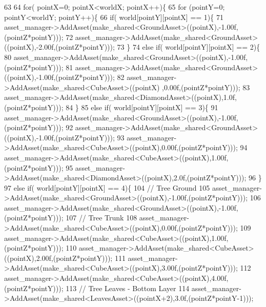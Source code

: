 \begin{DoxyCode}
63 
64   \textcolor{keywordflow}{for}( pointX=0; pointX<worldX; pointX++)\{
65    \textcolor{keywordflow}{for} (pointY=0; pointY<worldY; pointY++)\{
66     \textcolor{keywordflow}{if}( world[pointY][pointX] == 1)\{          
71             asset\_manager->AddAsset(make\_shared<GroundAsset>((pointX),-1.00f,(pointZ*pointY)));
72             asset\_manager->AddAsset(make\_shared<GroundAsset>((pointX),-2.00f,(pointZ*pointY)));
73    \}
74     \textcolor{keywordflow}{else} \textcolor{keywordflow}{if}( world[pointY][pointX] == 2)\{
80             asset\_manager->AddAsset(make\_shared<GroundAsset>((pointX),-1.00f,(pointZ*pointY)));
81             asset\_manager->AddAsset(make\_shared<GroundAsset>((pointX),-1.00f,(pointZ*pointY)));
82             asset\_manager->AddAsset(make\_shared<CubeAsset>((pointX)  ,0.00f,(pointZ*pointY)));
83             asset\_manager->AddAsset(make\_shared<DiamondAsset>((pointX),1.0f,(pointZ*pointY)));
84    \}
85     \textcolor{keywordflow}{else} \textcolor{keywordflow}{if}( world[pointY][pointX] == 3)\{
91             asset\_manager->AddAsset(make\_shared<GroundAsset>((pointX),-1.00f,(pointZ*pointY)));
92             asset\_manager->AddAsset(make\_shared<GroundAsset>((pointX),-1.00f,(pointZ*pointY)));
93             asset\_manager->AddAsset(make\_shared<CubeAsset>((pointX),0.00f,(pointZ*pointY)));
94             asset\_manager->AddAsset(make\_shared<CubeAsset>((pointX),1.00f,(pointZ*pointY)));
95             asset\_manager->AddAsset(make\_shared<DiamondAsset>((pointX),2.0f,(pointZ*pointY)));
96    \}
97     \textcolor{keywordflow}{else} \textcolor{keywordflow}{if}( world[pointY][pointX] == 4)\{
104             \textcolor{comment}{// Tree Ground}
105             asset\_manager->AddAsset(make\_shared<GroundAsset>((pointX),-1.00f,(pointZ*pointY)));
106             asset\_manager->AddAsset(make\_shared<GroundAsset>((pointX),-1.00f,(pointZ*pointY)));
107             \textcolor{comment}{// Tree Trunk}
108             asset\_manager->AddAsset(make\_shared<CubeAsset>((pointX),0.00f,(pointZ*pointY)));
109             asset\_manager->AddAsset(make\_shared<CubeAsset>((pointX),1.00f,(pointZ*pointY)));
110             asset\_manager->AddAsset(make\_shared<CubeAsset>((pointX),2.00f,(pointZ*pointY)));
111             asset\_manager->AddAsset(make\_shared<CubeAsset>((pointX),3.00f,(pointZ*pointY)));
112             asset\_manager->AddAsset(make\_shared<CubeAsset>((pointX),4.00f,(pointZ*pointY)));
113             \textcolor{comment}{// Tree Leaves - Bottom Layer}
114             asset\_manager->AddAsset(make\_shared<LeavesAsset>((pointX+2),3.0f,(pointZ*pointY-1)));

\end{DoxyCode}
